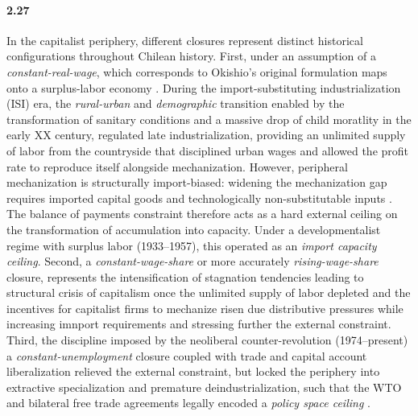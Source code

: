\paragraph{2.27}
In the capitalist periphery, different closures represent distinct historical configurations throughout Chilean history. First, under an assumption of a
\textit{constant-real-wage}, which corresponds to
Okishio's original formulation maps onto a surplus-labor
economy \citep{Lewis1954, Basu2026}. During the
import-substituting industrialization (ISI) era, the
\textit{rural-urban} and \textit{demographic} transition enabled by the transformation of sanitary conditions and a massive drop of child moratlity in the early XX century,  regulated late industrialization, providing an unlimited supply of labor from the countryside that disciplined urban wages and allowed the profit rate to reproduce itself alongside mechanization. 
However, peripheral mechanization is structurally import-biased:
widening the mechanization gap requires imported capital
goods and technologically non-substitutable inputs
\citep{Prebisch1981}. The balance of payments constraint
therefore acts as a hard external ceiling on the
transformation of accumulation into capacity. Under a
developmentalist regime with surplus labor (1933--1957), this operated as an
\textit{import capacity ceiling}. Second, a \textit{constant-wage-share} or more accurately \textit{rising-wage-share} closure, represents the intensification of stagnation tendencies leading to structural crisis of capitalism once the unlimited supply of labor depleted and the incentives for capitalist firms to mechanize risen due distributive pressures while increasing imnport requirements and stressing further the external constraint. Third, the discipline imposed by the neoliberal counter-revolution \citep{Casals2021} (1974--present) a \textit{constant-unemployment} closure coupled with trade and capital account liberalization relieved the external constraint, but locked the periphery into extractive specialization and premature deindustrialization, such that the WTO and bilateral free
trade agreements legally encoded a \textit{policy space ceiling} \citep{Ahumada2019, Palma2019}.


